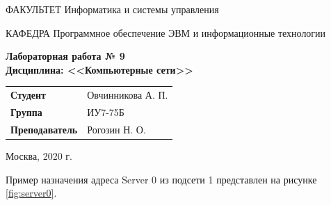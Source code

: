 \documentclass[a4paper,14pt]{article}
\begin{document}
\begin{titlepage}
    \begin{flushleft}
        ФАКУЛЬТЕТ Информатика и системы управления
    \end{flushleft}
    КАФЕДРА Программное обеспечение ЭВМ и информационные технологии

    \vspace{3cm}

    \begin{center}
        \textbf{Лабораторная работа № 9} \\
        \textbf{Дисциплина: <<Компьютерные сети>>}
        \vspace{0.5cm}
    \end{center}


    \vspace{3cm}

    \begin{flushleft}
        \begin{tabular}{ll}
            \textbf{Студент}       & Овчинникова А. П. \\
            \textbf{Группа}        & ИУ7-75Б           \\
            \textbf{Преподаватель} & Рогозин Н. О.     \\
        \end{tabular}
    \end{flushleft}

    \vspace{3cm}

    \begin{center}
        Москва, 2020 г.
    \end{center}

\end{titlepage}

\setcounter{page}{2}

Пример назначения адреса Server 0 из подсети 1 представлен на рисунке \ref{fig:server0}.
\end{document}

